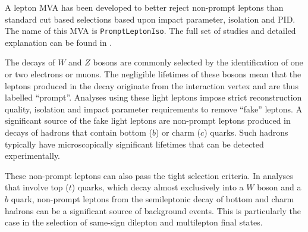 
A lepton MVA has been developed to better reject non-prompt leptons than standard cut based selections based upon impact parameter, isolation and PID. The name of this MVA is \texttt{PromptLeptonIso}. The full set of studies and detailed explanation can be found in \cite{ttW_140}.

The decays of $W$ and $Z$ bosons are commonly selected by the identification of one or two electrons or muons.  The negligible lifetimes of these bosons mean that the leptons produced in the decay originate from the interaction vertex and are thus labelled ``prompt''.  Analyses using these light leptons impose strict reconstruction quality, isolation and impact parameter requirements to remove ``fake'' leptons. A significant source of the fake light leptons are non-prompt leptons produced in decays of hadrons that contain bottom ($b$) or charm ($c$) quarks. Such hadrons typically have microscopically significant lifetimes that can be detected experimentally.

These non-prompt leptons can also pass the tight selection criteria. In analyses that involve top ($t$) quarks, which decay almost exclusively into a $W$ boson and a $b$ quark, non-prompt leptons from the semileptonic decay of bottom and charm hadrons can be a significant source of background events. This is particularly the case in the selection of same-sign dilepton and multilepton final states. 


